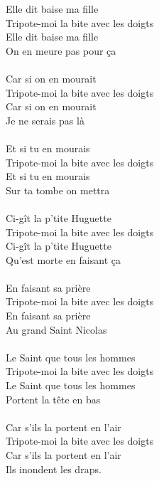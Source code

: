 \breakpage
Elle dit baise ma fille
\\Tripote-moi la bite avec les doigts
\\Elle dit baise ma fille
\\On en meure pas pour ça ~~~~~~~~~~~~\bissimple
\\\\Car si on en mourait
\\Tripote-moi la bite avec les doigts
\\Car si on en mourait
\\Je ne serais pas là  ~~~~~~~~~~~~~~~~~~~~~~\bissimple
\\\\Et si tu en mourais
\\Tripote-moi la bite avec les doigts
\\Et si tu en mourais
\\Sur ta tombe on mettra  ~~~~~~~~~~~~~~\bissimple
\\\\Ci-gît la p'tite Huguette
\\Tripote-moi la bite avec les doigts
\\Ci-gît la p'tite Huguette
\\Qu'est morte en faisant ça  ~~~~~~~~~~\bissimple
\\\\En faisant sa prière
\\Tripote-moi la bite avec les doigts
\\En faisant sa prière
\\Au grand Saint Nicolas  ~~~~~~~~~~~~~~~\bissimple
\\\\Le Saint que tous les hommes
\\Tripote-moi la bite avec les doigts
\\Le Saint que tous les hommes
\\Portent la tête en bas  ~~~~~~~~~~~~~~~~~\bissimple
\\\\Car s'ils la portent en l'air
\\Tripote-moi la bite avec les doigts
\\Car s'ils la portent en l'air
\\Ils inondent les draps.  ~~~~~~~~~~~~~~~~\bissimple

\breakpage